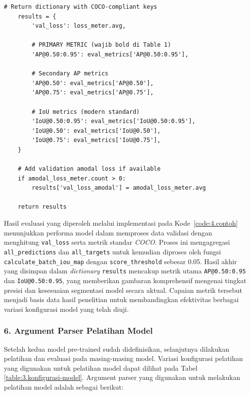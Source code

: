 \begin{lstlisting}[caption={Proses Evaluasi Model}, label={code:4.evaluasi_validate}]
    # Return dictionary with COCO-compliant keys
    results = {
        'val_loss': loss_meter.avg,
        
        # PRIMARY METRIC (wajib bold di Table 1)
        'AP@0.50:0.95': eval_metrics['AP@0.50:0.95'],
        
        # Secondary AP metrics
        'AP@0.50': eval_metrics['AP@0.50'],
        'AP@0.75': eval_metrics['AP@0.75'],
        
        # IoU metrics (modern standard)
        'IoU@0.50:0.95': eval_metrics['IoU@0.50:0.95'],
        'IoU@0.50': eval_metrics['IoU@0.50'],
        'IoU@0.75': eval_metrics['IoU@0.75'],
    }
    
    # Add validation amodal loss if available
    if amodal_loss_meter.count > 0:
        results['val_loss_amodal'] = amodal_loss_meter.avg
    
    return results
\end{lstlisting}
Hasil evaluasi yang diperoleh melalui implementasi pada Kode~\ref{code:4.contoh} menunjukkan performa model dalam memproses data validasi dengan menghitung \texttt{val\_loss} serta metrik standar \textit{COCO}. Proses ini mengagregasi \texttt{all\_predictions} dan \texttt{all\_targets} untuk kemudian diproses oleh fungsi \texttt{calculate\_batch\_iou\_map} dengan \texttt{score\_threshold} sebesar 0.05. Hasil akhir yang disimpan dalam \textit{dictionary} \texttt{results} mencakup metrik utama \texttt{AP@0.50:0.95} dan \texttt{IoU@0.50:0.95}, yang memberikan gambaran komprehensif mengenai tingkat presisi dan kesesuaian segmentasi model secara aktual. Capaian metrik tersebut menjadi basis data hasil penelitian untuk membandingkan efektivitas berbagai variasi konfigurasi model yang telah diuji.

\subsubsection*{\textnormal{6. Argument Parser Pelatihan Model}}
Setelah kedua model pre-trained sudah didefinisikan, selanjutnya dilakukan pelatihan dan evaluasi pada masing-masing model. Variasi konfigurasi pelatihan yang digunakan untuk pelatihan model dapat dilihat pada Tabel \ref{table:3.konfigurasi-model}. Argument parser yang digunakan untuk melakukan pelatihan model adalah sebagai berikut: 

